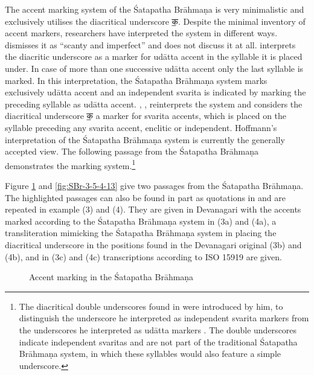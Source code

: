 The accent marking system of the Śatapatha Brāhmaṇa is very minimalistic and exclusively utilises the diacritical underscore {\devfont क॒}. Despite the minimal inventory of accent markers, researchers have interpreted the system in different ways. \citet[p.~88]{Whitney1889} dismisses it as “scanty and imperfect” and does not discuss it at all. \citet[p.~451]{Macdonell1916} interprets the diacritic underscore as a marker for udātta accent in the syllable it is placed under. In case of more than one successive udātta accent only the last syllable is marked. In this interpretation, the Śatapatha Brāhmaṇa system marks exclusively udātta accent and an independent svarita is indicated by marking the preceding syllable as udātta accent. \citet{Hoffmann1956},  \citep[English translation in][p.~475, n17]{Witzel1974}, reinterprets the system and considers the diacritical underscore {\devfont क॒} a marker for svarita accents, which is placed on the syllable preceding any svarita accent, enclitic or independent. Hoffmann’s interpretation of the Śatapatha Brāhmaṇa system is currently the generally accepted view. The following passage from the Śatapatha Brāhmaṇa \citep{Weber1849} demonstrates the marking system.\footnote{The diacritical double underscores found in \citet{Weber1849} were introduced by him, to distinguish the underscore he interpreted as independent svarita markers from the underscores he interpreted as udātta markers \citep[][p.~xii-xiii]{Weber1849}. The double underscores indicate independent svaritas and are not part of the traditional Śatapatha Brāhmaṇa system, in which these syllables would also feature a simple underscore.} 

Figure \ref{fig:SBr-1-1-2-9} and \ref{fig:SBr-3-5-4-13} give two passages from the Śatapatha Brāhmaṇa. The highlighted passages can also be found in part as quotations in \citet{pwg} and are repeated in example (3) and (4). They are given in Devanagari with the accents marked according to the Śatapatha Brāhmaṇa system in (3a) and (4a), a transliteration mimicking the Śatapatha Brāhmaṇa system in placing the diacritical underscore in the positions found in the Devanagari original (3b) and (4b), and in (3c) and (4c) transcriptions according to ISO 15919 are given.

\begin{figure}[!ht]
\begin{center}
\end{center}
\caption[Accent marking in the Śatapatha Brāhmaṇa]{\label{fig:SBr-1-1-2-9}Accent marking in the Śatapatha Brāhmaṇa}
\end{figure}

